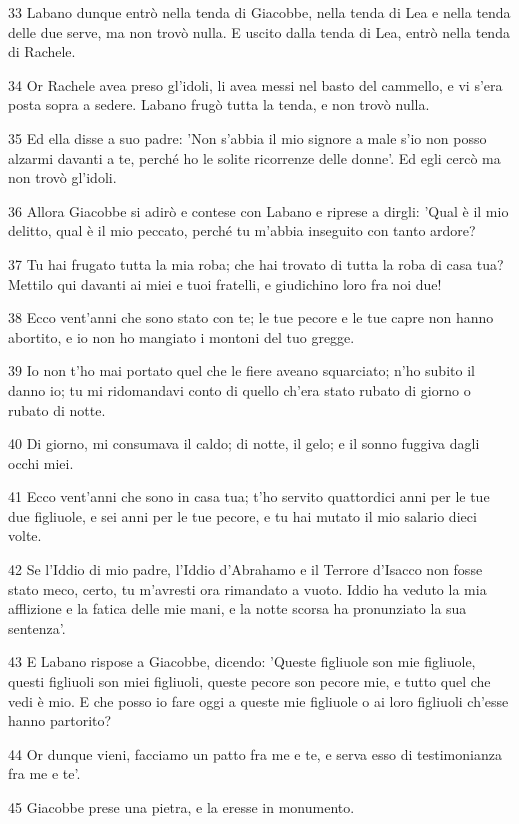 \par 33 Labano dunque entrò nella tenda di Giacobbe, nella tenda di Lea e nella tenda delle due serve, ma non trovò nulla. E uscito dalla tenda di Lea, entrò nella tenda di Rachele.
\par 34 Or Rachele avea preso gl'idoli, li avea messi nel basto del cammello, e vi s'era posta sopra a sedere. Labano frugò tutta la tenda, e non trovò nulla.
\par 35 Ed ella disse a suo padre: 'Non s'abbia il mio signore a male s'io non posso alzarmi davanti a te, perché ho le solite ricorrenze delle donne'. Ed egli cercò ma non trovò gl'idoli.
\par 36 Allora Giacobbe si adirò e contese con Labano e riprese a dirgli: 'Qual è il mio delitto, qual è il mio peccato, perché tu m'abbia inseguito con tanto ardore?
\par 37 Tu hai frugato tutta la mia roba; che hai trovato di tutta la roba di casa tua? Mettilo qui davanti ai miei e tuoi fratelli, e giudichino loro fra noi due!
\par 38 Ecco vent'anni che sono stato con te; le tue pecore e le tue capre non hanno abortito, e io non ho mangiato i montoni del tuo gregge.
\par 39 Io non t'ho mai portato quel che le fiere aveano squarciato; n'ho subito il danno io; tu mi ridomandavi conto di quello ch'era stato rubato di giorno o rubato di notte.
\par 40 Di giorno, mi consumava il caldo; di notte, il gelo; e il sonno fuggiva dagli occhi miei.
\par 41 Ecco vent'anni che sono in casa tua; t'ho servito quattordici anni per le tue due figliuole, e sei anni per le tue pecore, e tu hai mutato il mio salario dieci volte.
\par 42 Se l'Iddio di mio padre, l'Iddio d'Abrahamo e il Terrore d'Isacco non fosse stato meco, certo, tu m'avresti ora rimandato a vuoto. Iddio ha veduto la mia afflizione e la fatica delle mie mani, e la notte scorsa ha pronunziato la sua sentenza'.
\par 43 E Labano rispose a Giacobbe, dicendo: 'Queste figliuole son mie figliuole, questi figliuoli son miei figliuoli, queste pecore son pecore mie, e tutto quel che vedi è mio. E che posso io fare oggi a queste mie figliuole o ai loro figliuoli ch'esse hanno partorito?
\par 44 Or dunque vieni, facciamo un patto fra me e te, e serva esso di testimonianza fra me e te'.
\par 45 Giacobbe prese una pietra, e la eresse in monumento.
